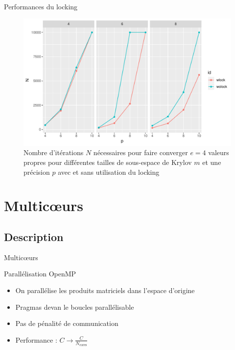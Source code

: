 \documentclass[9.5pt]{beamer}
\begin{document}
		\begin{frame}{Performances du locking}
			\begin{figure}
				\centering
				\includegraphics[width=0.8\linewidth, keepaspectratio]{../rapport/plots/Nvsp_complock.pdf}
				\caption{Nombre d'itérations $N$ nécessaires pour faire converger $e = 4$ valeurs propres pour différentes tailles de sous-espace de Krylov $m$ et une précision $p$ avec et sans utilisation du locking \label{fig:Nvsp_complock}}
			\end{figure}
		\end{frame}

\section{Multic\oe{}urs}
		\subsection{Description}
		\begin{frame}{Multic\oe{}urs}
			\begin{block}{Parallélisation OpenMP}
				\begin{itemize}
					\item On parallélise les produits matriciels dans l'espace d'origine
					\item Pragmas devan le boucles parallélisable
					\item Pas de pénalité de communication
					\item Performance : $C \rightarrow \frac{C}{N_\text{cores}}$
				\end{itemize}
			\end{block}
		\end{frame}
\end{document}
